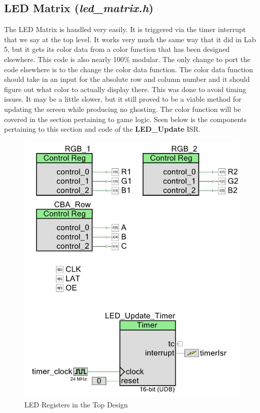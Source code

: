 \documentclass[a4paper, 12pt]{article}
\begin{document}
    
    \subsection{LED Matrix (\textit{led\_matrix.h})}

    The LED Matrix is handled very easily. It is triggered via the timer
    interrupt that we say at the top level. It works very much the same way
    that it did in Lab 5, but it gets its color data from a color function
    that has been designed elsewhere. This code is also nearly 100\% modular.
    The only change to port the code elsewhere is to the change the color
    data function. The color data function should take in an input for the
    absolute row and column number and it should figure out what color to
    actually display there. This was done to avoid timing issues. It may be
    a little slower, but it still proved to be a viable method for updating
    the screen while producing no ghosting. The color function will be
    covered in the section pertaining to game logic. Seen below is the components
    pertaining to this section and code of the \textbf{LED\_Update} ISR.

    \begin{figure}[H]
        \centering
        \includegraphics[scale=0.6]{pics/led_matrix}
        \caption{LED Registers in the Top Design}
        \label{fig:TopDesign}
    \end{figure}
\end{document}
